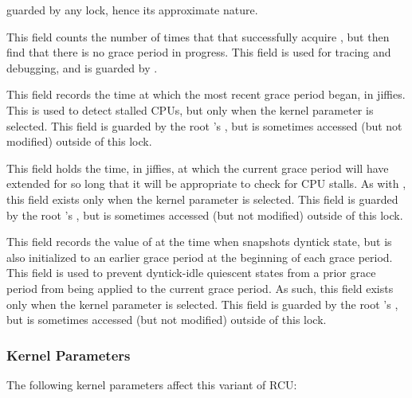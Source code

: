 \begin{description}
	guarded by any lock, hence its approximate nature.
\item[\co{n_force_qs_ngp}:]
	This field counts the number of times that
	 that successfully acquire
	, but then find that there is no grace period
	in progress.
	This field is used for tracing and debugging, and
	is guarded by .
\item[\co{gp_start}:]
	This field records the time at which the most recent grace period
	began, in jiffies.
	This is used to detect stalled CPUs, but only when the
	 kernel parameter is selected.
	This field is guarded by the root 's ,
	but is sometimes accessed (but not modified) outside of this
	lock.
\item[\co{jiffies_stall}:]
	This field holds the time, in jiffies, at which the current
	grace period will have extended for so long that it will
	be appropriate to check for CPU stalls.
	As with , this field exists only when the
	 kernel parameter is selected.
	This field is guarded by the root 's ,
	but is sometimes accessed (but not modified) outside of this
	lock.
\item[\co{dynticks_completed}:]
	This field records the value of  at the time when
	 snapshots dyntick state, but
	is also initialized to an earlier grace period at the beginning
	of each grace period.
	This field is used to prevent dyntick-idle quiescent states
	from a prior grace period from being applied to the current
	grace period.
	As such, this field exists only when the 
	kernel parameter is selected.
	This field is guarded by the root 's ,
	but is sometimes accessed (but not modified) outside of this
	lock.
\end{description}

\subsubsection{Kernel Parameters}
\label{app:rcuimpl:rcutreewt:Kernel Parameters}

The following kernel parameters affect this variant of RCU:

